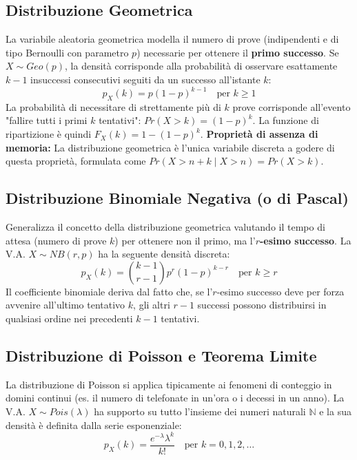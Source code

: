 \documentclass[12pt, a4paper]{article}
\begin{document}
\subsection{Distribuzione Geometrica}
La variabile aleatoria geometrica modella il numero di prove (indipendenti e di tipo Bernoulli con parametro $p$) necessarie per ottenere il \textbf{primo successo}.
Se $X \sim Geo(p)$, la densità corrisponde alla probabilità di osservare esattamente $k-1$ insuccessi consecutivi seguiti da un successo all'istante $k$:
$$ p_X(k) = p(1-p)^{k-1} \quad \text{per } k \ge 1 $$
La probabilità di necessitare di strettamente più di $k$ prove corrisponde all'evento "fallire tutti i primi $k$ tentativi": $Pr(X > k) = (1-p)^k$.
La funzione di ripartizione è quindi $F_X(k) = 1 - (1-p)^k$.
\textbf{Proprietà di assenza di memoria:} La distribuzione geometrica è l'unica variabile discreta a godere di questa proprietà, formulata come $Pr(X > n+k \mid X > n) = Pr(X > k)$.

\subsection{Distribuzione Binomiale Negativa (o di Pascal)}
Generalizza il concetto della distribuzione geometrica valutando il tempo di attesa (numero di prove $k$) per ottenere non il primo, ma l'\textbf{$r$-esimo successo}.
La V.A. $X \sim NB(r, p)$ ha la seguente densità discreta:
$$ p_X(k) = \binom{k-1}{r-1} p^r (1-p)^{k-r} \quad \text{per } k \ge r $$
Il coefficiente binomiale deriva dal fatto che, se l'$r$-esimo successo deve per forza avvenire all'ultimo tentativo $k$, gli altri $r-1$ successi possono distribuirsi in qualsiasi ordine nei precedenti $k-1$ tentativi.

\subsection{Distribuzione di Poisson e Teorema Limite}
La distribuzione di Poisson si applica tipicamente ai fenomeni di conteggio in domini continui (es. il numero di telefonate in un'ora o i decessi in un anno).
La V.A. $X \sim Pois(\lambda)$ ha supporto su tutto l'insieme dei numeri naturali $\mathbb{N}$ e la sua densità è definita dalla serie esponenziale:
$$ p_X(k) = \frac{e^{-\lambda} \lambda^k}{k!} \quad \text{per } k = 0, 1, 2, \dots $$
\end{document}
